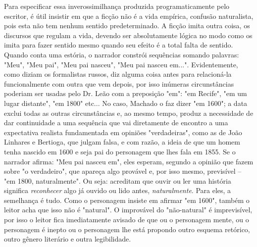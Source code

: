 Para especificar essa inverossimilhança produzida programaticamente pelo
escritor, é útil insistir em que a ficção não é a vida empírica,
confusão naturalista, pois esta não tem nenhum sentido predeterminado. A
ficção imita outra coisa, os discursos que regulam a vida, devendo ser
absolutamente lógica no modo como os imita para fazer sentido mesmo
quando seu efeito é a total falta de sentido. Quando conta uma estória,
o narrador constrói sequências somando palavras: "Meu", "Meu pai", "Meu
pai nasceu", "Meu pai nasceu em...". Evidentemente, como diziam os
formalistas russos, diz alguma coisa antes para relacioná-la
funcionalmente com outra que vem depois, por isso inúmeras
circunstâncias poderiam ser usadas pelo Dr. Leão com a preposição "em":
"em Recife", "em um lugar distante", "em 1800" etc... No caso, Machado o
faz dizer "em 1600"; a data exclui todas as outras circunstâncias e, ao
mesmo tempo, produz a necessidade de dar continuidade a uma sequência
que vai diretamente de encontro a uma expectativa realista fundamentada
em opiniões "verdadeiras", como as de João Linhares e Bertioga, que
julgam falsa, e com razão, a ideia de que um homem tenha nascido em 1600
e seja pai do personagem que lhes fala em 1855. Se o narrador afirma:
"Meu pai nasceu em", eles esperam, segundo a opinião que fazem sobre "o
verdadeiro", que apareça algo provável e, por isso mesmo, previsível --
"em 1800, naturalmente". Ou seja: acreditam que ouvir ou ler uma
história significa \emph{reconhecer} algo já ouvido ou lido antes,
\emph{naturalmente}. Para eles, a semelhança é tudo. Como o personagem
insiste em afirmar "em 1600", também o leitor acha que isso não é
"natural". O improvável do "não-natural" é imprevisível, por isso o
leitor fica imediatamente avisado de que ou o personagem mente, ou o
personagem é inepto ou o personagem lhe está propondo outro esquema
retórico, outro gênero literário e outra legibilidade.

